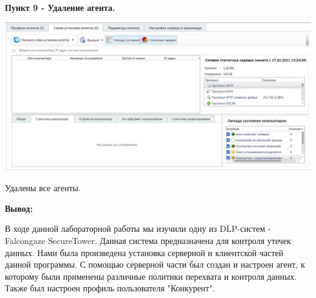 \documentclass[a4paper,14pt]{extarticle}
\begin{document}
    \textbf{Пункт 9 - Удаление агента.} 
    \begin{center}
        \includegraphics[scale=0.25]{pics/9.jpg}

        Удалены все агенты. 
    \end{center}

    \textbf{Вывод:}

    В ходе данной лабораторной работы мы изучили одну из DLP-систем - Falcongaze SecureTower. 
    Данная система предназначена для контроля утечек данных. Нами была произведена установка 
    серверной и клиентской частей данной программы. С помощью серверной части был создан и 
    настроен агент, к которому были применены различные политики перехвата и контроля данных. 
    Также был настроен профиль пользователя "Конкурент".
\end{document}
